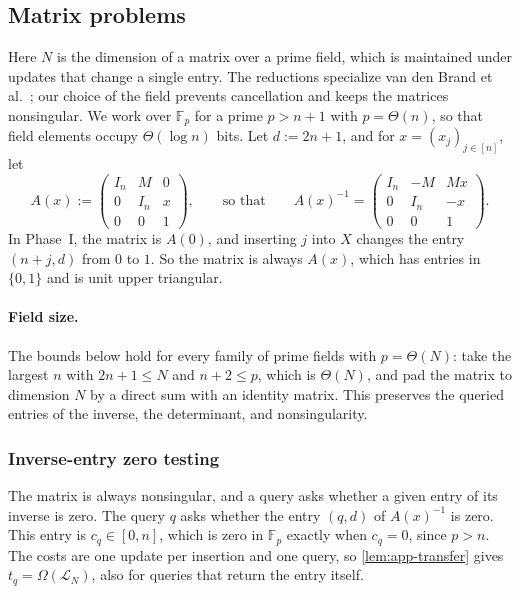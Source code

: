 \subsection{Matrix problems}\label{sec:app-matrices}

Here $N$ is the dimension of a matrix over a prime field, which is maintained under updates that change a single entry. The reductions specialize van den Brand et al.~\cite[Theorems~C.1 and~C.3]{van_den_brand_dynamic_2019}; our choice of the field prevents cancellation and keeps the matrices nonsingular. We work over $\mathbb F_p$ for a prime $p>n+1$ with $p=\Theta(n)$, so that field elements occupy $\Theta(\log n)$ bits. Let $d:=2n+1$, and for $x=(x_j)_{j\in[n]}$, let
\[
A(x):=\begin{pmatrix}
I_n&M&0\\
0&I_n&x\\
0&0&1
\end{pmatrix},
\qquad\text{so that}\qquad
A(x)^{-1}=\begin{pmatrix}
I_n&-M&Mx\\
0&I_n&-x\\
0&0&1
\end{pmatrix}.
\]
In Phase~I, the matrix is $A(0)$, and inserting $j$ into $X$ changes the entry $(n+j,d)$ from $0$ to $1$. So the matrix is always $A(x)$, which has entries in $\{0,1\}$ and is unit upper triangular.

\paragraph{Field size.}
The bounds below hold for every family of prime fields with $p=\Theta(N)$: take the largest $n$ with $2n+1\le N$ and $n+2\le p$, which is $\Theta(N)$, and pad the matrix to dimension $N$ by a direct sum with an identity matrix. This preserves the queried entries of the inverse, the determinant, and nonsingularity.

\subsubsection{Inverse-entry zero testing}\label{sec:app-inverse}

The matrix is always nonsingular, and a query asks whether a given entry of its inverse is zero. The query $q$ asks whether the entry $(q,d)$ of $A(x)^{-1}$ is zero. This entry is $c_q\in[0,n]$, which is zero in $\mathbb F_p$ exactly when $c_q=0$, since $p>n$. The costs are one update per insertion and one query, so \cref{lem:app-transfer} gives $t_q=\Omega(\mathcal L_N)$, also for queries that return the entry itself.

